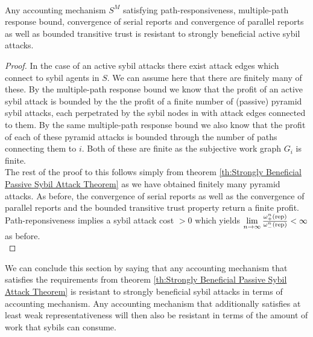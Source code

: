 \begin{corollary}[]\ \\
\label{cor:Strongly Beneficial Active Sybil Attack Corollary}
\noindent{}Any accounting mechanism $S^M$ satisfying path-responsiveness, multiple-path response bound, convergence of serial reports and convergence of parallel reports as well as bounded transitive trust is resistant to strongly beneficial active sybil attacks. 
\end{corollary}
\begin{proof}
\noindent{}In the case of an active sybil attacks there exist attack edges which connect to sybil agents in $S$. We can assume here that there are finitely many of these. By the multiple-path response bound we know that the profit of an active sybil attack is bounded by the the profit of a finite number of (passive) pyramid sybil attacks, each perpetrated by the sybil nodes in with attack edges connected to them. By the same multiple-path response bound we also know that the profit of each of these pyramid attacks is bounded through the number of paths connecting them to $i$. Both of these are finite as the subjective work graph $G_i$ is finite. \vspace{1em}\\ 

\noindent{}The rest of the proof to this follows simply from theorem \ref{th:Strongly Beneficial Passive Sybil Attack Theorem} as we have obtained finitely many pyramid attacks. As before, the convergence of serial reports as well as the convergence of parallel reports and the bounded transitive trust property return a finite profit. Path-reponsiveness implies a sybil attack cost $>0$ which yields $\lim\limits_{n\rightarrow\infty}\frac{\omega_{+}^n({\rm rep})}{\omega_{-}^n({\rm rep})} < \infty$ as before. \vspace{1em}\\
\end{proof}


\noindent{}We can conclude this section by saying that any accounting mechanism that satisfies the requirements from theorem \ref{th:Strongly Beneficial Passive Sybil Attack Theorem} is resistant to strongly beneficial sybil attacks in terms of accounting mechanism. Any accounting mechanism that additionally satisfies at least weak representativeness will then also be resistant in terms of the amount of work that sybils can consume.\vspace{1em}\\

